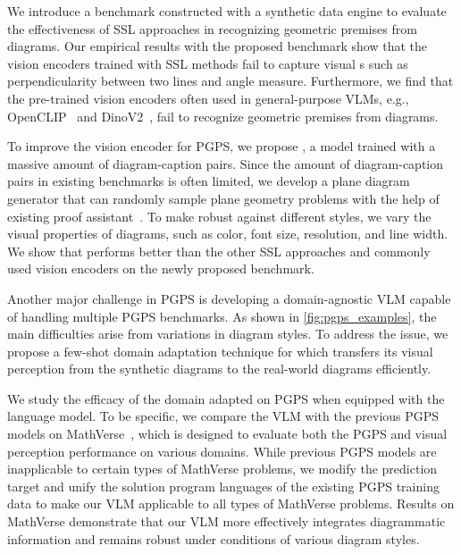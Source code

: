 We introduce a benchmark constructed with a synthetic data engine to evaluate the effectiveness of SSL approaches in recognizing geometric premises from diagrams. Our empirical results with the proposed benchmark show that the vision encoders trained with SSL methods fail to capture visual \geofeat{}s such as perpendicularity between two lines and angle measure.
Furthermore, we find that the pre-trained vision encoders often used in general-purpose VLMs, e.g., OpenCLIP~\citep{clip} and DinoV2~\citep{dinov2}, fail to recognize geometric premises from diagrams.

To improve the vision encoder for PGPS, we propose \geoclip{}, a model trained with a massive amount of diagram-caption pairs.
Since the amount of diagram-caption pairs in existing benchmarks is often limited, we develop a plane diagram generator that can randomly sample plane geometry problems with the help of existing proof assistant~\citep{alphageometry}.
To make \geoclip{} robust against different styles, we vary the visual properties of diagrams, such as color, font size, resolution, and line width.
We show that \geoclip{} performs better than the other SSL approaches and commonly used vision encoders on the newly proposed benchmark.

Another major challenge in PGPS is developing a domain-agnostic VLM capable of handling multiple PGPS benchmarks. As shown in \cref{fig:pgps_examples}, the main difficulties arise from variations in diagram styles. 
To address the issue, we propose a few-shot domain adaptation technique for \geoclip{} which transfers its visual \geofeat{} perception from the synthetic diagrams to the real-world diagrams efficiently. 

We study the efficacy of the domain adapted \geoclip{} on PGPS when equipped with the language model. To be specific, we compare the VLM with the previous PGPS models on MathVerse~\citep{mathverse}, which is designed to evaluate both the PGPS and visual \geofeat{} perception performance on various domains.
While previous PGPS models are inapplicable to certain types of MathVerse problems, we modify the prediction target and unify the solution program languages of the existing PGPS training data to make our VLM applicable to all types of MathVerse problems.
Results on MathVerse demonstrate that our VLM more effectively integrates diagrammatic information and remains robust under conditions of various diagram styles.

